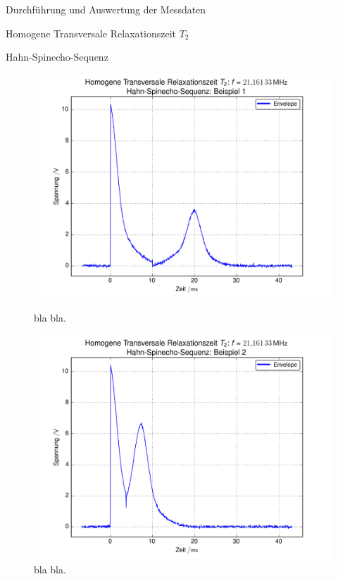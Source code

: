 \documentclass[pdftex, a4paper,11pt, twoside, ngerman]{report}
\begin{document}
\begin{chapter}{Durchführung und Auswertung der Messdaten}
\begin{section}{
        Homogene Transversale Relaxationszeit $T_{2}$}
\begin{subsection}{Hahn-Spinecho-Sequenz}
        
        \begin{figure}[htb]
          \centering
          \begin{minipage}{.48\textwidth}
            \centering
            \includegraphics[width=\textwidth]
            {Figures/HomoTransRelax_Hahn_beispiel0.png}
            \caption{bla bla.}
            \label{figHahnBsp1}
          \end{minipage}\quad
          \begin{minipage}{.48\textwidth}
            \centering
            \includegraphics[width=\textwidth]
            {Figures/HomoTransRelax_Hahn_beispiel1.png}
            \caption{bla bla.}
            \label{figHahnBsp2}
          \end{minipage}
        \end{figure}
        

\end{subsection}
\end{section}
\end{chapter}
\end{document}
